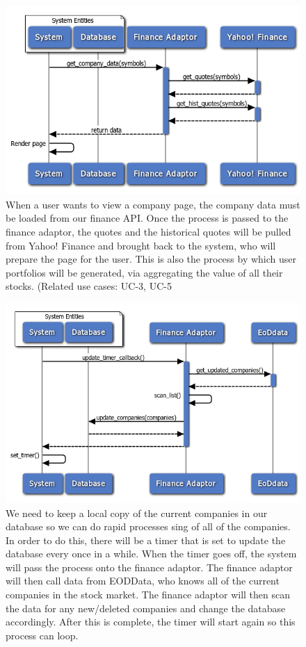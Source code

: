 \begin{figure}[!h]
\centering
\includegraphics[width=5.5in]{./Diagrams/InteractionDiagrams/rendercompanypage.png}
\caption{When a user wants to view a company page, the company data must be loaded from our finance API. Once the process is passed to the finance adaptor, the quotes and the historical quotes will be pulled from Yahoo! Finance and brought back to the system, who will prepare the page for the user. This is also the process by which user portfolios will be generated, via aggregating the value of all their stocks. (Related use cases: UC-3, UC-5}
\end{figure}

\begin{figure}[!h]
\centering
\includegraphics[width=5.5in]{./Diagrams/InteractionDiagrams/updatingdatabase.png}
\caption{We need to keep a local copy of the current companies in our database so we can do rapid processes sing of all of the companies. In order to do this, there will be a timer that is set to update the database every once in a while. When the timer goes off, the system will pass the process onto the finance adaptor. The finance adaptor will then call data from EODData, who knows all of the current companies in the stock market. The finance adaptor will then scan the data for any new/deleted companies and change the database accordingly. After this is complete, the timer will start again so this process can loop.}
\end{figure}
